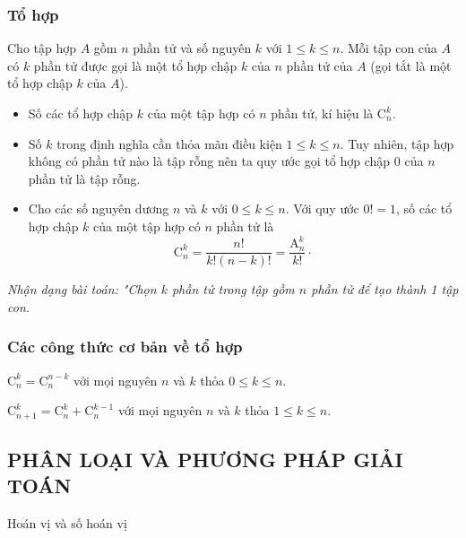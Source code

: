 \subsubsection{Tổ hợp}
Cho tập hợp $A$ gồm $n$ phần tử và số nguyên $k$ với $1\le k\le n$. Mỗi tập con của $A$ có $k$ phần tử được gọi là một tổ hợp chập $k$ của $n$ phần tử của $A$ (gọi tắt là một tổ hợp chập $k$ của $A$).
\begin{boxkn}
	\begin{itemize}
		\item [$\bullet$] Số các tổ hợp chập $k$ của một tập hợp có $n$ phần tử, kí hiệu là
		$\mathrm{C}_n^k$. 
		\item [$\bullet$] Số $k$  trong định nghĩa cần thỏa mãn điều kiện $1 \leq k \leq n$. Tuy nhiên, tập hợp không có phần tử nào là tập rỗng nên ta quy ước gọi tổ hợp chập $0$  của $n$  phần tử là tập rỗng.
		\item [$\bullet$] Cho các số nguyên dương $n$ và $k$ với $0\le k\le n$. Với quy ước $0! = 1$, số các tổ hợp chập $k$ của một tập hợp có $n$ phần tử là
		$$\mathrm{C}_n^k=\dfrac{n!}{k!(n-k)!}=\dfrac{\mathrm{A}_n^k}{k!}\cdot$$
	\end{itemize}
\end{boxkn}
\noindent
\textit{Nhận dạng bài toán: "Chọn $k$ phần tử trong tập gồm $n$ phần tử để tạo thành 1 tập con.}
\subsubsection{Các công thức cơ bản về tổ hợp}
\begin{boxkn}
	\begin{listEX}[1]
		\item [\ding{172}] $\mathrm{C}_n^k=\mathrm{C}_n^{n-k}$ với mọi nguyên $n$ và $k$ thỏa $0\le k\le n$.
		\item [\ding{173}] $\mathrm{C}_{n+1}^k=\mathrm{C}_n^k+\mathrm{C}_n^{k-1}$ với mọi nguyên $n$ và $k$ thỏa $1\le k\le n$.
	\end{listEX}
\end{boxkn}
\subsection{PHÂN LOẠI VÀ PHƯƠNG PHÁP GIẢI TOÁN}
\begin{dang}{Hoán vị và số hoán vị}
\end{dang}

